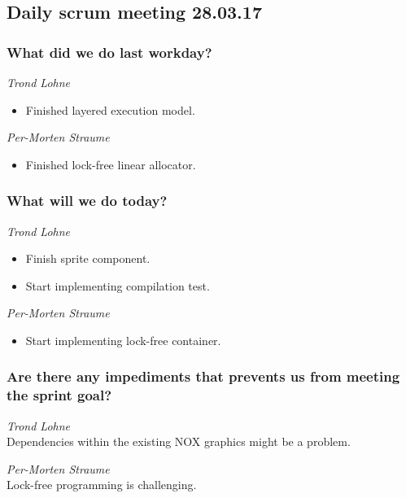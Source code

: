 \documentclass{article}
\begin{document}
\begin{center}
\subsection*{Daily scrum meeting 28.03.17}
\end{center}
\bigskip


\subsubsection*{What did we do last workday?}

\noindent\textit{Trond Lohne}
\begin{itemize}
	\item 
	Finished layered execution model.
\end{itemize}

\medskip

\noindent\textit{Per-Morten Straume}
\begin{itemize}
	\item 
	Finished lock-free linear allocator.
\end{itemize}


\subsubsection*{What will we do today?}

\noindent\textit{Trond Lohne}
\begin{itemize}
	\item 
	Finish sprite component.
	
	\item 
	Start implementing compilation test.
\end{itemize}

\medskip

\noindent\textit{Per-Morten Straume}
\begin{itemize}
	\item 
	Start implementing lock-free container.
\end{itemize}


\subsubsection*{Are there any impediments that prevents us from meeting the sprint goal?}

\noindent\textit{Trond Lohne}\\
Dependencies within the existing NOX graphics might be a problem.

\medskip

\noindent\textit{Per-Morten Straume}\\
Lock-free programming is challenging.
\end{document}
